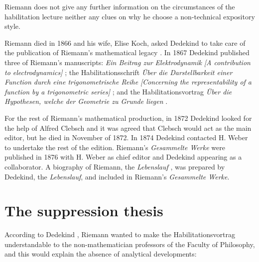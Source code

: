 \documentclass[12pt]{article}
\begin{document}
\noindent Riemann does not give any further information on the circumstances of the habilitation lecture neither any clues on why he choose a non-technical expository style.

Riemann died in 1866 and his wife, Elise Koch, asked Dedekind to take care of the publication of Riemann's mathematical legacy \cite{Dedekind1876a}. In 1867 Dedekind published three of Riemann's manuscripts: {\it Ein Beitrag zur Elektrodynamik} {\it [A contribution to electrodynamics]} \cite{Riemann1867}; the Habilitationsschrift {\it \"Uber die Darstellbarkeit einer Function durch eine trigonometrische Reihe} {\it [Concerning the representability of a function by a trigonometric series]} \cite{Riemann1868a}; and the Habilitationsvortrag {\it \"Uber die Hypothesen, welche der Geometrie zu Grunde liegen} \cite{Riemann1868b}.

For the rest of Riemann's mathematical production, in 1872 Dedekind looked for the help of Alfred Clebsch and it was agreed that Clebsch would act as the main editor, but he died in November of 1872. In 1874 Dedekind contacted H. Weber to undertake the rest of the edition. Riemann's {\it Gesammelte Werke} were published in 1876 \cite{Riemann1876} with H. Weber as chief editor and Dedekind appearing as a collaborator. A biography of Riemann, the {\it Lebenslauf} \cite{Dedekind1876b}, was prepared by Dedekind, the {\it Lebenslauf}, and included in Riemann's {\it Gesammelte Werke}.

\section{The suppression thesis}

According to Dedekind \cite{Dedekind1876b}, Riemann wanted to make the Habilitationsvortrag understandable to the non-mathematician professors of the Faculty of Philosophy, and this would explain the absence of analytical developments:
\end{document}
